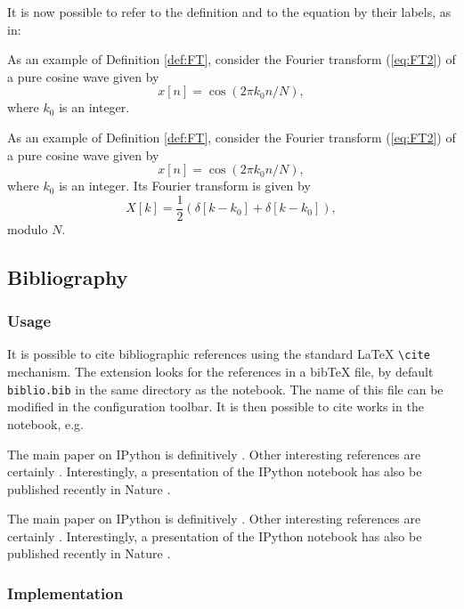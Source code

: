 \documentclass[11pt]{article}
\begin{document}
    It is now possible to refer to the definition and to the equation by
their labels, as in:

\begin{listing}
As an example of Definition \ref{def:FT}, consider the Fourier transform (\ref{eq:FT2}) of a pure cosine wave given by
$$
x[n]= \cos(2\pi k_0 n/N),
$$
where $k_0$ is an integer. 
\end{listing}

    As an example of Definition \ref{def:FT}, consider the Fourier transform
(\ref{eq:FT2}) of a pure cosine wave given by \[
x[n]= \cos(2\pi k_0 n/N),
\] where \(k_0\) is an integer. Its Fourier transform is given by \[
X[k] = \frac{1}{2} \left( \delta[k-k_0] + \delta[k-k_0] \right), 
\] modulo \(N\).

    \subsection{Bibliography}\label{bibliography}

    \subsubsection{Usage}\label{usage}

    It is possible to cite bibliographic references using the standard LaTeX
\texttt{\textbackslash{}cite} mechanism. The extension looks for the
references in a bibTeX file, by default \texttt{biblio.bib} in the same
directory as the notebook. The name of this file can be modified in the
configuration toolbar. It is then possible to cite works in the
notebook, e.g.

\begin{listing}
The main paper on IPython is definitively \cite{PER-GRA:2007}. Other interesting references are certainly \cite{mckinney2012python, rossant2013learning}. Interestingly, a presentation of the IPython notebook has also be published recently in Nature \cite{shen2014interactive}.
\end{listing}

The main paper on IPython is definitively \cite{PER-GRA:2007}. Other
interesting references are certainly
\cite{mckinney2012python, rossant2013learning}. Interestingly, a
presentation of the IPython notebook has also be published recently in
Nature \cite{shen2014interactive}.

    \subsubsection{Implementation}\label{implementation}
\end{document}
